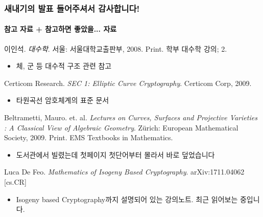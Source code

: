 \documentclass[aspectratio=169,mathserif]{beamer}
\begin{document}
  \begin{frame}
    \frametitle{새내기의 발표 들어주셔서 감사합니다!}
    \framesubtitle{참고 자료 + 참고하면 좋았을... 자료}

    이인석. {\it 대수학}. 서울: 서울대학교출판부, 2008. Print. 학부 대수학 강의; 2.
    \begin{itemize}
      \item 체, 군 등 대수적 구조 관련 참고
    \end{itemize}
    Certicom Research. {\it SEC 1: Elliptic Curve Cryptography}. Certicom Corp, 2009.
    \begin{itemize}
      \item 타원곡선 암호체계의 표준 문서
    \end{itemize}
    Beltrametti, Mauro. et. al. {\it Lectures on Curves, Surfaces and Projective Varieties : A Classical View of Algebraic Geometry}. Zürich: European Mathematical Society, 2009. Print. EMS Textbooks in Mathematics.
    \begin{itemize}
      \item 도서관에서 빌렸는데 첫페이지 첫단어부터 몰라서 바로 덮었습니다
    \end{itemize}
    Luca De Feo. {\it Mathematics of Isogeny Based Cryptography}. arXiv:1711.04062 [cs.CR]
    \begin{itemize}
      \item Isogeny based Cryptography까지 설명되어 있는 강의노트. 최근 읽어보는 중입니다.
    \end{itemize}
  \end{frame}
\end{document}
